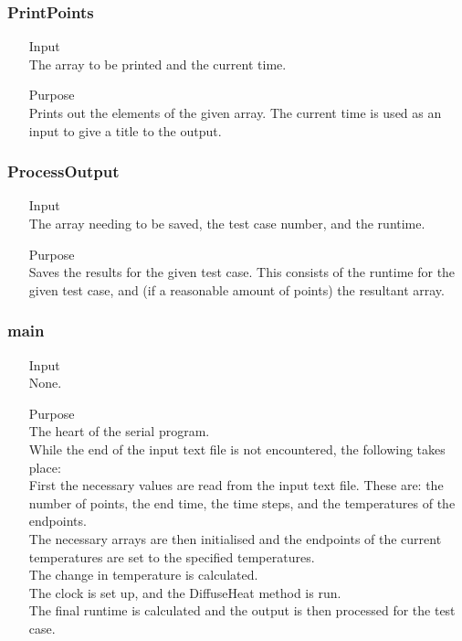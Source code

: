 \documentclass[11pt,a4paper]{article}
\begin{document}
\subsubsection{PrintPoints}
\begin{itemize}
	\item[Input] \hfill\\
	The array to be printed and the current time.
	\item[Purpose] \hfill\\
	Prints out the elements of the given array. The current time is used as an input to give a title to the output.
\end{itemize}

\subsubsection{ProcessOutput}
\begin{itemize}
	\item[Input] \hfill\\
	The array needing to be saved, the test case number, and the runtime.
	\item[Purpose] \hfill\\
	Saves the results for the given test case. This consists of the runtime for the given test case, and (if a reasonable amount of points) the resultant array.
\end{itemize}

\subsubsection{main}
\begin{itemize}
	\item[Input] \hfill\\
	None.
	\item[Purpose] \hfill\\
	The heart of the serial program.\\
	While the end of the input text file is not encountered, the following takes place:\\
	First the necessary values are read from the input text file. These are: the number of points, the end time, the time steps, and the temperatures of the endpoints.\\
	The necessary arrays are then initialised and the endpoints of the current temperatures are set to the specified temperatures.\\
	The change in temperature is calculated.\\
	The clock is set up, and the DiffuseHeat method is run.\\
	The final runtime is calculated and the output is then processed for the test case.
\end{itemize}
\end{document}
